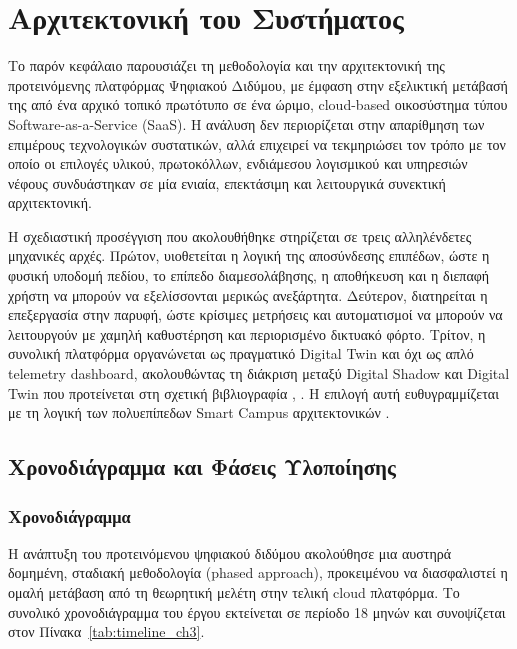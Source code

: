 \chapter{Αρχιτεκτονική του Συστήματος}
Το παρόν κεφάλαιο παρουσιάζει τη μεθοδολογία και την αρχιτεκτονική της προτεινόμενης πλατφόρμας Ψηφιακού Διδύμου, με έμφαση στην εξελικτική μετάβασή της από ένα αρχικό τοπικό πρωτότυπο σε ένα ώριμο, \textlatin{cloud-based} οικοσύστημα τύπου \textlatin{Software-as-a-Service (SaaS)}. Η ανάλυση δεν περιορίζεται στην απαρίθμηση των επιμέρους τεχνολογικών συστατικών, αλλά επιχειρεί να τεκμηριώσει τον τρόπο με τον οποίο οι επιλογές υλικού, πρωτοκόλλων, ενδιάμεσου λογισμικού και υπηρεσιών νέφους συνδυάστηκαν σε μία ενιαία, επεκτάσιμη και λειτουργικά συνεκτική αρχιτεκτονική.

Η σχεδιαστική προσέγγιση που ακολουθήθηκε στηρίζεται σε τρεις αλληλένδετες μηχανικές αρχές. Πρώτον, υιοθετείται η λογική της αποσύνδεσης επιπέδων, ώστε η φυσική υποδομή πεδίου, το επίπεδο διαμεσολάβησης, η αποθήκευση και η διεπαφή χρήστη να μπορούν να εξελίσσονται μερικώς ανεξάρτητα. Δεύτερον, διατηρείται η επεξεργασία στην παρυφή, ώστε κρίσιμες μετρήσεις και αυτοματισμοί να μπορούν να λειτουργούν με χαμηλή καθυστέρηση και περιορισμένο δικτυακό φόρτο. Τρίτον, η συνολική πλατφόρμα οργανώνεται ως πραγματικό \textlatin{Digital Twin} και όχι ως απλό \textlatin{telemetry dashboard}, ακολουθώντας τη διάκριση μεταξύ \textlatin{Digital Shadow} και \textlatin{Digital Twin} που προτείνεται στη σχετική βιβλιογραφία \cite{Grieves2017}, \cite{Kritzinger2018}. Η επιλογή αυτή ευθυγραμμίζεται με τη λογική των πολυεπίπεδων \textlatin{Smart Campus} αρχιτεκτονικών \cite{Han2022}.

\section{Χρονοδιάγραμμα και Φάσεις Υλοποίησης}
\subsection{Χρονοδιάγραμμα}
Η ανάπτυξη του προτεινόμενου ψηφιακού διδύμου ακολούθησε μια αυστηρά δομημένη, σταδιακή μεθοδολογία (\textlatin{phased approach}), προκειμένου να διασφαλιστεί η ομαλή μετάβαση από τη θεωρητική μελέτη στην τελική \textlatin{cloud} πλατφόρμα. Το συνολικό χρονοδιάγραμμα του έργου εκτείνεται σε περίοδο 18 μηνών και συνοψίζεται στον Πίνακα~\ref{tab:timeline_ch3}.

